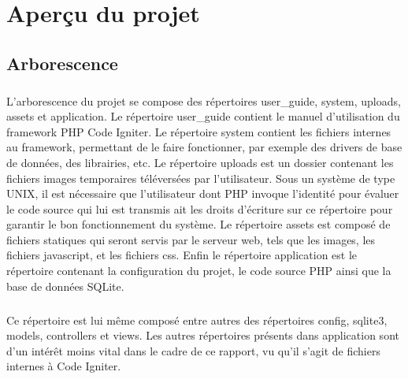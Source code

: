 \chapter{Aperçu du projet}
\section{Arborescence}
    \paragraph{}
        L'arborescence du projet se compose des répertoires user\_guide, system,
        uploads, assets et application.
        Le répertoire user\_guide contient le manuel d'utilisation du framework
        PHP Code Igniter.
        Le répertoire system contient les fichiers internes au framework,
        permettant de le faire fonctionner, par exemple des drivers de base
        de données, des librairies, etc.
        Le répertoire uploads est un dossier contenant les fichiers images
        temporaires téléversées par l'utilisateur.
        Sous un système de type UNIX, il est nécessaire que l'utilisateur dont
        PHP invoque l'identité pour évaluer le code source qui lui est
        transmis ait les droits d'écriture sur ce répertoire pour garantir le
        bon fonctionnement du système.
        Le répertoire assets est composé de fichiers statiques qui seront
        servis par le serveur web, tels que les images, les fichiers javascript,
        et les fichiers css.
        Enfin le répertoire application est le répertoire contenant la
        configuration du projet, le code source PHP ainsi que la base de
        données SQLite.

    \paragraph{}
        Ce répertoire est lui même composé entre autres des répertoires
        config, sqlite3, models, controllers et views.
        Les autres répertoires présents dans application sont d'un intérêt moins
        vital dans le cadre de ce rapport, vu qu'il s'agit de fichiers internes
        à Code Igniter.

